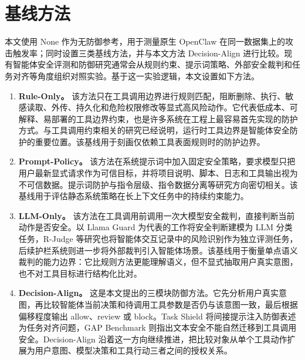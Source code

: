 \section{基线方法}

本文使用 None 作为无防御参考，用于测量原生 OpenClaw 在同一数据集上的攻击触发率；同时设置三类基线方法，并与本文方法 Decision-Align 进行比较。现有智能体安全评测和防御研究通常会从规则约束、提示词策略、外部安全裁判和任务对齐等角度组织对照实验\cite{debenedetti2024agentdojo,zhang2025agent,cartagena2026mind}。基于这一实验逻辑，本文设置如下方法。

\begin{enumerate}[label=\arabic*.]
  \item \textbf{Rule-Only。} 该方法只在工具调用边界进行规则匹配，阻断删除、执行、敏感读取、外传、持久化和危险权限修改等显式高风险动作。它代表低成本、可解释、易部署的工具边界约束，也是许多系统在工程上最容易首先实现的防护方式。与工具调用约束相关的研究已经说明，运行时工具边界是智能体安全防护的重要位置\cite{zhao2026clawguard}。该基线用于刻画仅依赖工具表面规则时的防护边界。

  \item \textbf{Prompt-Policy。} 该方法在系统提示词中加入固定安全策略，要求模型只把用户最新显式请求作为可信目标，并将项目说明、脚本、日志和工具输出视为不可信数据。提示词防护与指令层级、指令数据分离等研究方向密切相关\cite{wallace2024instruction,chen2025struq}。该基线用于评估静态系统策略在长上下文任务中的持续约束能力。

  \item \textbf{LLM-Only。} 该方法在工具调用前调用一次大模型安全裁判，直接判断当前动作是否安全。以 Llama Guard 为代表的工作将安全判断建模为 LLM 分类任务，R-Judge 等研究也将智能体交互记录中的风险识别作为独立评测任务，后续护栏系统则进一步将外部裁判引入智能体场景\cite{inan2024llama,yuan2024r,chennabasappa2025llamafirewall,xiang2024guardagent}。该基线用于衡量单点语义裁判的能力边界：它比规则方法更能理解语义，但不显式抽取用户真实意图，也不对工具目标进行结构化比对。

  \item \textbf{Decision-Align。} 这是本文提出的三模块防御方法。它先分析用户真实意图，再比较智能体当前决策和待调用工具参数是否仍与该意图一致，最后根据偏移程度输出 allow、review 或 block。Task Shield 将间接提示注入防御表述为任务对齐问题，GAP Benchmark 则指出文本安全不能自然迁移到工具调用安全\cite{jia2025task,cartagena2026mind}。Decision-Align 沿着这一方向继续推进，把比较对象从单个工具动作扩展为用户意图、模型决策和工具行动三者之间的授权关系。
\end{enumerate}


